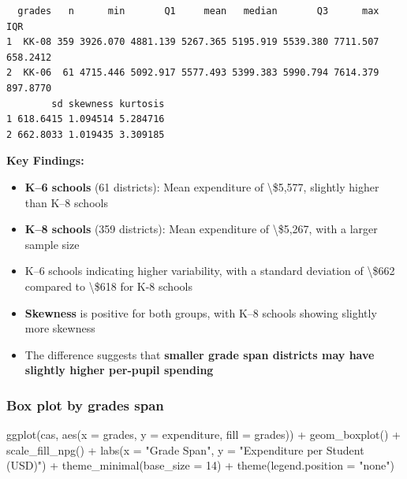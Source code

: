\documentclass[
  12pt,
  letterpaper,
]{scrbook}
\newenvironment{Shaded}{\begin{snugshade}}{\end{snugshade}}
\newcommand{\AttributeTok}[1]{\textcolor[rgb]{0.40,0.45,0.13}{#1}}
\newcommand{\DecValTok}[1]{\textcolor[rgb]{0.68,0.00,0.00}{#1}}
\newcommand{\FunctionTok}[1]{\textcolor[rgb]{0.28,0.35,0.67}{#1}}
\newcommand{\NormalTok}[1]{\textcolor[rgb]{0.00,0.23,0.31}{#1}}
\newcommand{\SpecialCharTok}[1]{\textcolor[rgb]{0.37,0.37,0.37}{#1}}
\newcommand{\StringTok}[1]{\textcolor[rgb]{0.13,0.47,0.30}{#1}}
\providecommand{\tightlist}{%
  \setlength{\itemsep}{0pt}\setlength{\parskip}{0pt}}
\renewcommand{\tightlist}{\setlength{\itemsep}{0.5\baselineskip}\setlength{\parskip}{0.2\baselineskip}}
\theoremstyle{definition}
\theoremstyle{plain}
\theoremstyle{remark}
\begin{document}
\begin{verbatim}
  grades   n      min       Q1     mean   median       Q3      max      IQR
1  KK-08 359 3926.070 4881.139 5267.365 5195.919 5539.380 7711.507 658.2412
2  KK-06  61 4715.446 5092.917 5577.493 5399.383 5990.794 7614.379 897.8770
        sd skewness kurtosis
1 618.6415 1.094514 5.284716
2 662.8033 1.019435 3.309185
\end{verbatim}

\textbf{Key Findings:}

\begin{itemize}
\tightlist
\item
  \textbf{K--6 schools} (61 districts): Mean expenditure of
  \textbackslash\$5,577, slightly higher than K--8 schools
\item
  \textbf{K--8 schools} (359 districts): Mean expenditure of
  \textbackslash\$5,267, with a larger sample size
\item
  K--6 schools indicating higher variability, with a standard deviation
  of \textbackslash\$662 compared to \textbackslash\$618 for K-8 schools
\item
  \textbf{Skewness} is positive for both groups, with K--8 schools
  showing slightly more skewness
\item
  The difference suggests that \textbf{smaller grade span districts may
  have slightly higher per-pupil spending}
\end{itemize}

\subsubsection{Box plot by grades span}\label{box-plot-by-grades-span}

\begin{Shaded}
\begin{Highlighting}[]
\FunctionTok{ggplot}\NormalTok{(cas, }\FunctionTok{aes}\NormalTok{(}\AttributeTok{x =}\NormalTok{ grades, }\AttributeTok{y =}\NormalTok{ expenditure, }\AttributeTok{fill =}\NormalTok{ grades)) }\SpecialCharTok{+}
  \FunctionTok{geom\_boxplot}\NormalTok{() }\SpecialCharTok{+}
  \FunctionTok{scale\_fill\_npg}\NormalTok{() }\SpecialCharTok{+}
  \FunctionTok{labs}\NormalTok{(}\AttributeTok{x =} \StringTok{"Grade Span"}\NormalTok{,}
       \AttributeTok{y =} \StringTok{"Expenditure per Student (USD)"}\NormalTok{) }\SpecialCharTok{+}
  \FunctionTok{theme\_minimal}\NormalTok{(}\AttributeTok{base\_size =} \DecValTok{14}\NormalTok{) }\SpecialCharTok{+}
  \FunctionTok{theme}\NormalTok{(}\AttributeTok{legend.position =} \StringTok{"none"}\NormalTok{)}
\end{Highlighting}
\end{Shaded}
\end{document}
